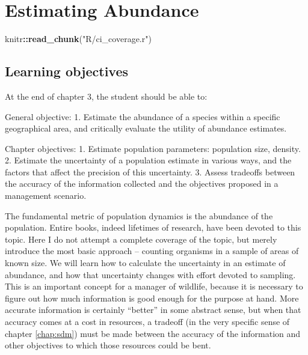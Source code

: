 \documentclass[]{book}
\newenvironment{Shaded}{\begin{snugshade}}{\end{snugshade}}
\newcommand{\KeywordTok}[1]{\textcolor[rgb]{0.13,0.29,0.53}{\textbf{#1}}}
\newcommand{\NormalTok}[1]{#1}
\newcommand{\OperatorTok}[1]{\textcolor[rgb]{0.81,0.36,0.00}{\textbf{#1}}}
\newcommand{\StringTok}[1]{\textcolor[rgb]{0.31,0.60,0.02}{#1}}
\theoremstyle{definition}
\theoremstyle{definition}
\theoremstyle{definition}
\theoremstyle{remark}
\begin{document}
\hypertarget{chap:abundance}{%
\chapter{Estimating Abundance}\label{chap:abundance}}

\begin{Shaded}
\begin{Highlighting}[]
\NormalTok{knitr}\OperatorTok{::}\KeywordTok{read_chunk}\NormalTok{(}\StringTok{"R/ci_coverage.r"}\NormalTok{)}
\end{Highlighting}
\end{Shaded}

\hypertarget{learning-objectives-2}{%
\section{Learning objectives}\label{learning-objectives-2}}

At the end of chapter 3, the student should be able to:

General objective: 1. Estimate the abundance of a species within a
specific geographical area, and critically evaluate the utility of
abundance estimates.

Chapter objectives: 1. Estimate population parameters: population size,
density. 2. Estimate the uncertainty of a population estimate in various
ways, and the factors that affect the precision of this uncertainty. 3.
Assess tradeoffs between the accuracy of the information collected and
the objectives proposed in a management scenario.

The fundamental metric of population dynamics is the abundance of the
population. Entire books, indeed lifetimes of research, have been
devoted to this topic. Here I do not attempt a complete coverage of the
topic, but merely introduce the most basic approach -- counting
organisms in a sample of areas of known size. We will learn how to
calculate the uncertainty in an estimate of abundance, and how that
uncertainty changes with effort devoted to sampling. This is an
important concept for a manager of wildlife, because it is necessary to
figure out how much information is good enough for the purpose at hand.
More accurate information is certainly ``better'' in some abstract
sense, but when that accuracy comes at a cost in resources, a tradeoff
(in the very specific sense of chapter \ref{chap:sdm}) must be made
between the accuracy of the information and other objectives to which
those resources could be bent.
\end{document}
